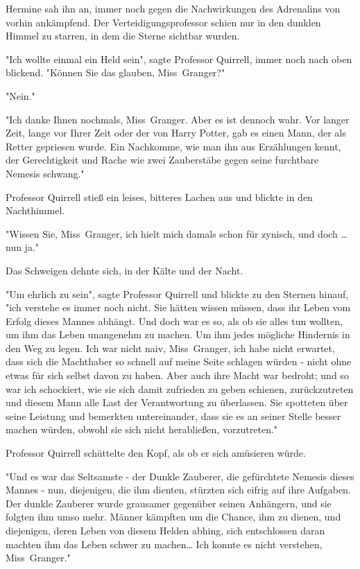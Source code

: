 {Hermine sah ihn an, immer noch gegen die Nachwirkungen des Adrenalins von vorhin ankämpfend. Der Verteidigungsprofessor schien nur in den dunklen Himmel zu starren, in dem die Sterne sichtbar wurden.

"Ich wollte einmal ein Held sein", sagte Professor Quirrell, immer noch nach oben blickend. "Können Sie das glauben, Miss~Granger?"

"Nein."

"Ich danke Ihnen nochmals, Miss~Granger. Aber es ist dennoch wahr. Vor langer Zeit, lange vor Ihrer Zeit oder der von Harry Potter, gab es einen Mann, der als Retter gepriesen wurde. Ein Nachkomme, wie man ihn aus Erzählungen kennt, der Gerechtigkeit und Rache wie zwei Zauberstäbe gegen seine furchtbare Nemesis schwang."

Professor Quirrell stieß ein leises, bitteres Lachen aus und blickte in den Nachthimmel.

"Wissen Sie, Miss~Granger, ich hielt mich damals schon für zynisch, und doch … nun ja."

Das Schweigen dehnte sich, in der Kälte und der Nacht.

"Um ehrlich zu sein", sagte Professor Quirrell und blickte zu den Sternen hinauf, "ich verstehe es immer noch nicht. Sie hätten wissen müssen, dass ihr Leben vom Erfolg dieses Mannes abhängt. Und doch war es so, als ob sie alles tun wollten, um ihm das Leben unangenehm zu machen. Um ihm jedes mögliche Hindernis in den Weg zu legen. Ich war nicht naiv, Miss~Granger, ich habe nicht erwartet, dass sich die Machthaber so schnell auf meine Seite schlagen würden - nicht ohne etwas für sich selbst davon zu haben. Aber auch ihre Macht war bedroht; und so war ich schockiert, wie sie sich damit zufrieden zu geben schienen, zurückzutreten und diesem Mann alle Last der Verantwortung zu überlassen. Sie spotteten über seine Leistung und bemerkten untereinander, dass sie es an seiner Stelle besser machen würden, obwohl sie sich nicht herabließen, vorzutreten."

Professor Quirrell schüttelte den Kopf, als ob er sich amüsieren würde.

"Und es war das Seltsamste - der Dunkle Zauberer, die gefürchtete Nemesis dieses Mannes - nun, diejenigen, die ihm dienten, stürzten sich eifrig auf ihre Aufgaben. Der dunkle Zauberer wurde grausamer gegenüber seinen Anhängern, und sie folgten ihm umso mehr. Männer kämpften um die Chance, ihm zu dienen, und diejenigen, deren Leben von diesem Helden abhing, sich entschlossen daran machten ihm das Leben schwer zu machen… Ich konnte es nicht verstehen, Miss~Granger."

}
